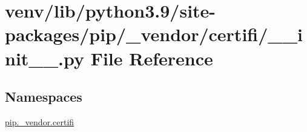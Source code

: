 \hypertarget{venv_2lib_2python3_89_2site-packages_2pip_2__vendor_2certifi_2____init_____8py}{}\section{venv/lib/python3.9/site-\/packages/pip/\+\_\+vendor/certifi/\+\_\+\+\_\+init\+\_\+\+\_\+.py File Reference}
\label{venv_2lib_2python3_89_2site-packages_2pip_2__vendor_2certifi_2____init_____8py}
\subsection*{Namespaces}
\begin{DoxyCompactItemize}
\item 
 \hyperlink{namespacepip_1_1__vendor_1_1certifi}{pip.\+\_\+vendor.\+certifi}
\end{DoxyCompactItemize}
